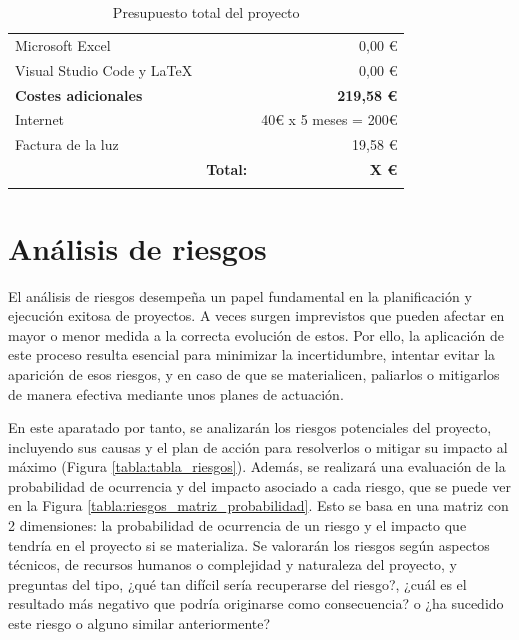 \begin{longtable}[c]{lm{2cm}r}
Microsoft Excel                         && 0,00 €             \\
Visual Studio Code y LaTeX              && 0,00 €             \\
\midrule
\textbf{Costes adicionales}             && \textbf{219,58 €}  \\
Internet                                && 40€ x 5 meses = 200€           \\
Factura de la luz                       && 19,58 €            \\
\midrule
  &   \multicolumn{1}{r}{\textbf{Total:}} & \textbf{X €} \\
\bottomrule
\caption{Presupuesto total del proyecto}
\label{tabla:presupuesto_total}
\end{longtable}


\section{Análisis de riesgos} \label{riesgos}
El análisis de riesgos desempeña un papel fundamental en la planificación y ejecución exitosa de proyectos. A veces surgen imprevistos que pueden afectar en mayor o menor medida a la correcta evolución de estos. Por ello, la aplicación de este proceso resulta esencial para minimizar la incertidumbre, intentar evitar la aparición de esos riesgos, y en caso de que se materialicen, paliarlos o mitigarlos de manera efectiva mediante unos planes de actuación.

En este aparatado por tanto, se analizarán los riesgos potenciales del proyecto, incluyendo sus causas y el plan de acción para resolverlos o mitigar su impacto al máximo (Figura \ref{tabla:tabla_riesgos}). Además, se realizará una evaluación de la probabilidad de ocurrencia y del impacto asociado a cada riesgo, que se puede ver en la Figura \ref{tabla:riesgos_matriz_probabilidad}. Esto se basa en una matriz con 2 dimensiones: la probabilidad de ocurrencia de un riesgo y el impacto que tendría en el proyecto si se materializa. Se valorarán los riesgos según aspectos técnicos, de recursos humanos o complejidad y naturaleza del proyecto, y preguntas del tipo, ¿qué tan difícil sería recuperarse del riesgo?, ¿cuál es el resultado más negativo que podría originarse como consecuencia? o ¿ha sucedido este riesgo o alguno similar anteriormente?

